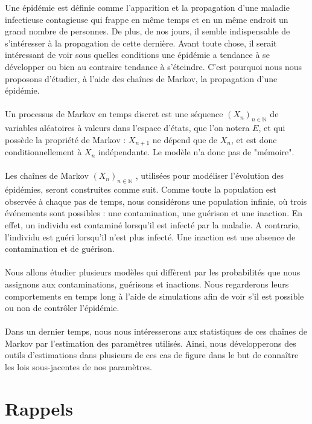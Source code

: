 \documentclass[12pt,a4paper]{report}
\theoremstyle{remark}
\begin{document}
Une épidémie est définie comme l'apparition et la propagation d'une maladie infectieuse contagieuse qui frappe en même temps et en un même endroit un grand nombre de personnes. De plus, de nos jours, il semble indispensable de s'intéresser à la propagation de cette dernière. Avant toute chose, il serait intéressant de voir sous quelles conditions une épidémie a tendance à se développer ou bien au contraire tendance à s'éteindre. C'est pourquoi nous nous proposons d'étudier, à l'aide des chaînes de Markov, la propagation d'une épidémie.
\\
\\
Un processus de Markov en temps discret est une séquence $(X_n)_{n\in\mathbb{N}}$ de variables aléatoires à valeurs dans l'espace d'états, que l'on notera $E$, et qui possède la propriété de Markov : $X_{n+1}$ ne dépend que de $X_n$, et est donc conditionnellement à $X_n$ indépendante. Le modèle n'a donc pas de "mémoire".
\\
\\
Les chaînes de Markov $(X_n)_{n \in \mathbb{N}}$ , utilisées pour modéliser l'évolution des épidémies, seront construites comme suit. Comme toute la population est observée à chaque pas de temps, nous considérons une population infinie, où trois événements sont possibles : une contamination, une guérison et une inaction. En effet, un individu est contaminé lorsqu'il est infecté par la maladie. A contrario, l'individu est guéri lorsqu'il n'est plus infecté. Une inaction est une absence de contamination et de guérison.
\\
\\
Nous allons étudier plusieurs modèles qui diffèrent par les probabilités que nous assignons aux contaminations, guérisons et inactions. Nous regarderons leurs comportements en temps long à l'aide de simulations afin de voir s'il est possible ou non de contrôler l'épidémie.
\\
\\
Dans un dernier temps, nous nous intéresserons aux statistiques de ces chaînes de Markov par l'estimation des paramètres utilisés. Ainsi, nous développerons des outils d'estimations dans plusieurs de ces cas de figure dans le but de connaître les lois sous-jacentes de nos paramètres.

\newpage
\chapter*{Rappels}
\end{document}

